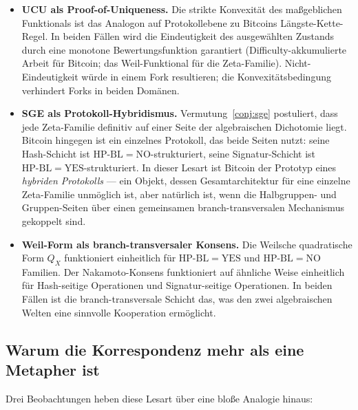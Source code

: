 \documentclass[11pt]{article}
\theoremstyle{definition}
\theoremstyle{remark}
\newcommand{\HBL}{\mathrm{HP\text{-}BL}}
\begin{document}
\begin{itemize}
\item \textbf{UCU als Proof-of-Uniqueness.}
Die strikte Konvexität des maßgeblichen Funktionals ist das Analogon auf
Protokollebene zu Bitcoins Längste-Kette-Regel. In beiden Fällen wird
die Eindeutigkeit des ausgewählten Zustands durch eine monotone Bewertungsfunktion
garantiert (Difficulty-akkumulierte Arbeit für Bitcoin; das Weil-Funktional
für die Zeta-Familie). Nicht-Eindeutigkeit würde in einem Fork resultieren; die
Konvexitätsbedingung verhindert Forks in beiden Domänen.

\item \textbf{SGE als Protokoll-Hybridismus.}
Vermutung~\ref{conj:sge} postuliert, dass jede Zeta-Familie definitiv auf
einer Seite der algebraischen Dichotomie liegt. Bitcoin hingegen ist ein einzelnes
Protokoll, das beide Seiten nutzt: seine Hash-Schicht ist $\HBL = \mathrm{NO}$-strukturiert,
seine Signatur-Schicht ist $\HBL = \mathrm{YES}$-strukturiert. In dieser Lesart ist
Bitcoin der Prototyp eines \emph{hybriden Protokolls} --- ein Objekt, dessen Gesamtarchitektur
für eine einzelne Zeta-Familie unmöglich ist, aber natürlich ist,
wenn die Halbgruppen- und Gruppen-Seiten über einen gemeinsamen
branch-transversalen Mechanismus gekoppelt sind.

\item \textbf{Weil-Form als branch-transversaler Konsens.}
Die Weilsche quadratische Form $Q_X$ funktioniert einheitlich für
$\HBL = \mathrm{YES}$ und $\HBL = \mathrm{NO}$ Familien. Der Nakamoto-Konsens
funktioniert auf ähnliche Weise einheitlich für Hash-seitige Operationen und Signatur-seitige
Operationen. In beiden Fällen ist die branch-transversale
Schicht das, was den zwei algebraischen Welten eine sinnvolle Kooperation ermöglicht.
\end{itemize}

\subsection{Warum die Korrespondenz mehr als eine Metapher ist}
\label{sec:blockchain-substance}

Drei Beobachtungen heben diese Lesart über eine bloße Analogie hinaus:
\end{document}
